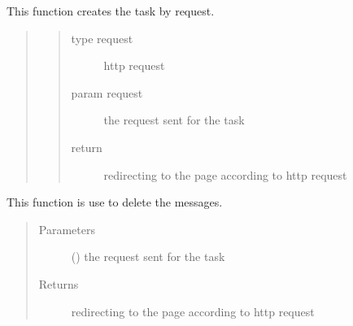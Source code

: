 \documentclass[letterpaper,10pt,english]{sphinxmanual}
\begin{document}
\begin{fulllineitems}
\label{\detokenize{janta:janta.views.create_task}}
This function creates the task by request.
\begin{quote}
\begin{quote}\begin{description}
\item[{type request}] \leavevmode
http request

\item[{param request}] \leavevmode
the request sent for the task

\item[{return}] \leavevmode
redirecting to the page according to http request

\end{description}\end{quote}
\end{quote}

\end{fulllineitems}


\begin{fulllineitems}
\label{\detokenize{janta:janta.views.delete_messages}}
This function is use to delete the messages.
\begin{quote}\begin{description}
\item[{Parameters}] \leavevmode
{} () \textendash{} the request sent for the task

\item[{Returns}] \leavevmode
redirecting to the page according to http request

\end{description}\end{quote}

\end{fulllineitems}

\end{document}
